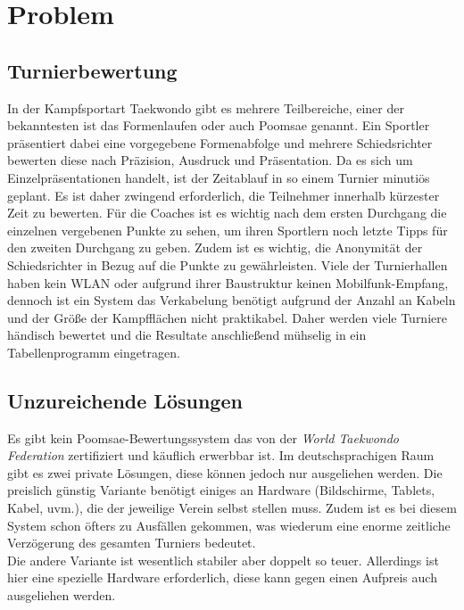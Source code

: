 \section{Problem}


\subsection{Turnierbewertung}
In der Kampfsportart Taekwondo gibt es mehrere Teilbereiche, einer der bekanntesten ist das Formenlaufen oder auch Poomsae genannt.
Ein Sportler präsentiert dabei eine vorgegebene Formenabfolge und mehrere Schiedsrichter bewerten diese nach
Präzision, Ausdruck und Präsentation.
Da es sich um Einzelpräsentationen handelt, ist der Zeitablauf in so einem Turnier minutiös geplant.
Es ist daher zwingend erforderlich, die Teilnehmer innerhalb kürzester Zeit zu bewerten.
Für die Coaches ist es wichtig nach dem ersten Durchgang die einzelnen vergebenen Punkte zu sehen, um ihren Sportlern
    noch letzte Tipps für den zweiten Durchgang zu geben.
Zudem ist es wichtig, die Anonymität der Schiedsrichter in Bezug auf die Punkte zu gewährleisten.
Viele der Turnierhallen haben kein WLAN oder aufgrund ihrer Baustruktur keinen Mobilfunk-Empfang, dennoch ist ein System
das Verkabelung benötigt aufgrund der Anzahl an Kabeln und der Größe der Kampfflächen nicht praktikabel.
Daher werden viele Turniere händisch bewertet und die Resultate anschließend mühselig in ein Tabellenprogramm eingetragen.
	
\subsection{Unzureichende Lösungen}

Es gibt kein Poomsae-Bewertungssystem das von der \emph{World Taekwondo Federation} zertifiziert und käuflich erwerbbar ist.
Im deutschsprachigen Raum gibt es zwei private Lösungen, diese können jedoch nur ausgeliehen werden.
Die preislich günstig Variante benötigt einiges an Hardware (Bildschirme, Tablets, Kabel, uvm.), die der jeweilige Verein selbst stellen muss.
Zudem ist es bei diesem System schon öfters zu Ausfällen gekommen, was wiederum eine enorme zeitliche
Verzögerung des gesamten Turniers bedeutet.
\\
Die andere Variante ist wesentlich stabiler aber doppelt so teuer.
Allerdings ist hier eine spezielle Hardware erforderlich, diese kann gegen einen Aufpreis auch ausgeliehen werden.

